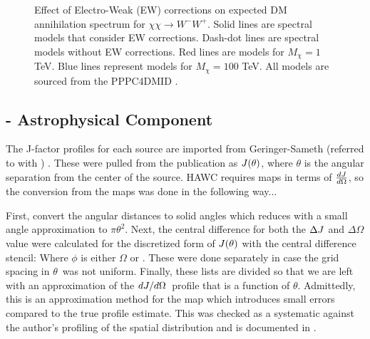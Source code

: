 \begin{figure}
\caption{Effect of Electro-Weak (EW) corrections on expected DM annihilation spectrum for $\chi\chi \rightarrow W^-W^+$. Solid lines are spectral models that consider EW corrections. Dash-dot lines are spectral models without EW corrections. Red lines are models for $M_\chi = 1$ TeV. Blue lines represent models for $M_\chi = 100$ TeV. All models are sourced from the PPPC4DMID \cite{Cirelli_2011}.}
\label{fig:ew_vs_noew}
\end{figure}

\subsection{\J - Astrophysical Component}\label{sec:gd_spatialmodel}

The J-factor profiles for each source are imported from Geringer-Sameth (referred to with \GS) \cite{Geringer_Sameth_2015}.
These were pulled from the publication as $J(\theta)$, where $\theta$ is the angular separation from the center of the source.
HAWC requires maps in terms of $\frac{dJ}{d\Omega}$, so the conversion from the maps was done in the following way...

First, convert the angular distances to solid angles
\angleTOsolidangle
which reduces with a small angle approximation to $\pi \theta^2$.
Next, the central difference for both the $\Delta J$ and $\Delta \Omega$ value were calculated for the discretized form of $J(\theta)$ with the central difference stencil:
\centerDiff
Where $\phi$ is either $\Omega$ or \J.
These were done separately in case the grid spacing in $\theta$~was not uniform.
Finally, these lists are divided so that we are left with an approximation of the $dJ/d\Omega$~profile that is a function of $\theta$.
Admittedly, this is an approximation method for the map which introduces small errors compared to the true profile estimate.
This was checked as a systematic against the author's profiling of the spatial distribution and is documented in .

